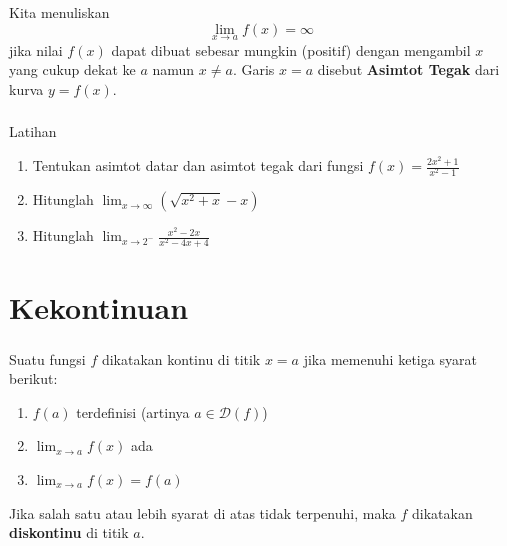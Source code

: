 \documentclass{../../kalkulus-ppt}
\newcommand{\dom}{\mathcal{D}}
\begin{document}
\begin{frame}
    \frametitle{\insertsection}
    \begin{definisi}
        Kita menuliskan \[\lim_{x\to a} f(x) = \infty\]
        jika nilai $f(x)$ dapat dibuat sebesar mungkin (positif) dengan mengambil $x$ yang cukup dekat ke $a$ namun $x \ne a$. Garis $x=a$ disebut \textbf{Asimtot Tegak} dari kurva $y=f(x)$.
    \end{definisi}
\end{frame}

\begin{frame}
    \frametitle{\insertsection}
    \begin{exampleblock}{Latihan}
        \begin{enumerate}
            \item Tentukan asimtot datar dan asimtot tegak dari fungsi $\displaystyle f(x) = \frac{2x^2+1}{x^2-1}$
            \item Hitunglah $\displaystyle\lim_{x\to \infty} \left(\sqrt{x^2+x} - x\right)$
            \item Hitunglah $\displaystyle\lim_{x\to 2^-} \frac{x^2-2x}{x^2-4x+4}$
        \end{enumerate}
    \end{exampleblock}
\end{frame}

\section{Kekontinuan}
\begin{frame}
    \frametitle{\insertsection}
    \begin{definisi}
        Suatu fungsi $f$ dikatakan kontinu di titik $x = a$ jika memenuhi ketiga syarat berikut:
        \begin{enumerate}
            \item $f(a)$ terdefinisi (artinya $a \in \dom(f)$)
            \item $\displaystyle\lim_{x\to a} f(x)$ ada
            \item $\displaystyle\lim_{x\to a} f(x) = f(a)$
        \end{enumerate}
        Jika salah satu atau lebih syarat di atas tidak terpenuhi, maka $f$ dikatakan \textbf{diskontinu} di titik $a$.
    \end{definisi}
\end{frame}
\end{document}
